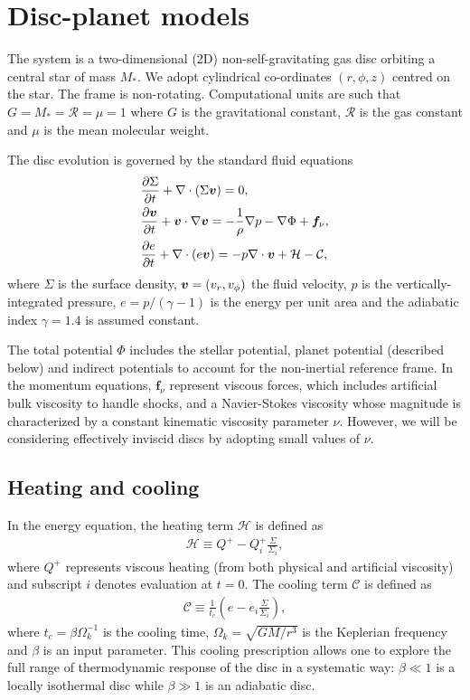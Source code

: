 \section{Disc-planet models}\label{model}
The system is a two-dimensional (2D) non-self-gravitating gas disc orbiting
a central star of mass $M_*$. We adopt cylindrical
co-ordinates $(r,\phi,z)$ centred on the star. The frame is   
non-rotating. Computational units are such that 
$G=M_*=\mathcal{R}=\mu=1$ where $G$ is the gravitational constant,
$\mathcal{R}$ is the gas constant and $\mu$ is the mean molecular
weight. 

The disc evolution is governed by the standard fluid equations  
\begin{align}\label{3d_gov_eq}
  &\frac{\p\Sigma}{\p t}+\nabla\cdot(\Sigma \bv)=0, \\
  & \frac{\p\bv}{\p t}+\bv\cdot\nabla\bv= -\frac{1}{\rho}\nabla p 
  - \nabla{\Phi} + \bm{f}_\nu,\\
  & \frac{\p e}{\p t} + \nabla\cdot(e\bv) = -p\nabla\cdot\bv +
  \mathcal{H} - \mathcal{C}, %
\end{align}
where $\Sigma$ is the surface density, $\bm{v} = (v_r,v_\phi)$ the fluid
velocity, $p$ is the vertically-integrated pressure, $e=p/(\gamma-1)$ is the energy
per unit area and the adiabatic index $\gamma=1.4$ is assumed
constant. 

The total potential $\Phi$ includes the stellar potential, planet potential
(described below) 
and indirect potentials to account for the non-inertial reference
frame. 
In the momentum equations, $\bm{f}_\nu$ represent viscous forces, 
which includes artificial bulk viscosity to handle shocks, and a
Navier-Stokes viscosity whose magnitude is  
characterized by a constant kinematic viscosity parameter
$\nu$. However, we will be considering effectively inviscid discs by
adopting small values of $\nu$.  

\subsection{Heating and cooling}
In the energy equation, the heating term $\mathcal{H}$ is defined as 
\begin{align}
  \mathcal{H} \equiv Q^+ - Q^+_i\frac{\Sigma}{\Sigma_i}, 
\end{align}
where $Q^+$ represents viscous heating (from both physical and
  artificial viscosity) and subscript $i$ denotes
evaluation at $t=0$. The cooling term $\mathcal{C}$ is defined as
\begin{align}
  \mathcal{C} \equiv \frac{1}{t_c}\left(e -
  e_i\frac{\Sigma}{\Sigma_i}\right),  
\end{align}
where $t_c = \beta\Omega_k^{-1}$ is the cooling time,
$\Omega_k=\sqrt{GM/r^3}$ is the Keplerian frequency and $\beta$ is an
input parameter. This cooling prescription allows one 
to explore the full range of thermodynamic response of the disc in a 
systematic way: $\beta\ll1$ is a locally isothermal disc while
$\beta\gg1$ is an adiabatic disc.  


